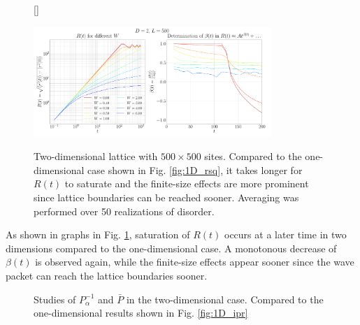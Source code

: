\documentclass[10pt,a4paper]{article}
\begin{document}
\begin{figure}[H]
[\FBwidth]
{\caption{Two-dimensional lattice with $500\times500$ sites. Compared to the one-dimensional case shown in Fig. \ref{fig:1D_rsq}, it takes longer for $R(t)$ to saturate and the finite-size effects are more prominent since lattice boundaries can be reached sooner. Averaging was performed over 50 realizations of disorder.}\label{fig:2D_rsq}}
{\includegraphics[width=0.8\textwidth]{2D_Anderson_localization_Seminar_scaling_analysis_D2_shape_500_500_r_sq_dynamics.pdf}}
\end{figure}
\noindent
As shown in graphs in Fig. \ref{fig:2D_rsq}, saturation of $R(t)$ occurs at a later time in two dimensions compared to the one-dimensional case. A monotonous decrease of $\beta(t)$ is observed again, while the finite-size effects appear sooner since the wave packet can reach the lattice boundaries sooner. 
\begin{figure}[H]
\caption{Studies of $P^{-1}_\alpha$ and $\bar{P}$ in the two-dimensional case. Compared to the one-dimensional results shown in Fig. \ref{fig:1D_ipr}}
\label{fig:2D_ipr} 
\end{figure}
\end{document}

